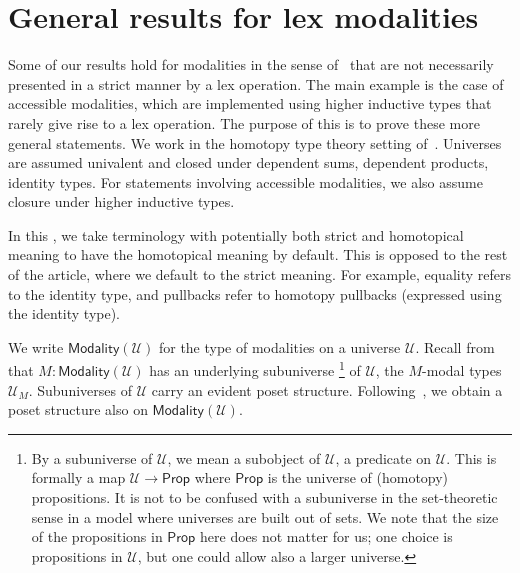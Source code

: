 \documentclass[10pt,a4paper,draft]{article}
\newcommand{\UU}{\mathcal{U}}%
\newcommand{\D}{D}              %
\renewcommand{\~}{\widetilde}
\newcommand{\Modality}{\mathsf{Modality}}
\newcommand{\aug}{\mathsf{aug}}
\newcommand{\M}{\mathcal{M}}
\newcommand{\join}{\mathop{\star}}
\newcommand{\Prop}{\mathsf{Prop}}
\newcounter{diagram}
\newtheorem{lemma}[theorem]{Lemma}
\theoremstyle{definition}
\theoremstyle{remark} %
\begin{document}

\section{General results for lex modalities}\label{sec:general-results}

Some of our results hold for modalities in the sense of~\cite{RijkeSS17} that are not necessarily presented in a strict manner by a lex operation.
The main example is the case of accessible modalities, which are implemented using higher inductive types that rarely give rise to a lex operation.
The purpose of this  is to prove these more general statements.
We work in the homotopy type theory setting of~\cite{RijkeSS17}.
Universes are assumed univalent and closed under dependent sums, dependent products, identity types.
For statements involving accessible modalities, we also assume closure under higher inductive types.

In this , we take terminology with potentially both strict and homotopical meaning to have the homotopical meaning by default.
This is opposed to the rest of the article, where we default to the strict meaning.
For example, equality refers to the identity type, and pullbacks refer to homotopy pullbacks (expressed using the identity type).

We write $\Modality(\UU)$ for the type of modalities on a universe $\UU$.
Recall from~\cite{RijkeSS17} that $M : \Modality(\UU)$ has an underlying subuniverse%
\footnote{%
By a subuniverse of $\UU$, we mean a subobject of $\UU$, \ie a predicate on $\UU$.
This is formally a map $\UU \to \Prop$ where $\Prop$ is the universe of (homotopy) propositions.
It is not to be confused with a subuniverse in the set\hyp{}theoretic sense in a model where universes are built out of sets.
We note that the size of the propositions in $\Prop$ here does not matter for us; one choice is propositions in $\UU$, but one could allow also a larger universe.
}
of $\UU$, the $M$\hyp{}modal types $\UU_M$.
Subuniverses of $\UU$ carry an evident poset structure.
Following~\cite[Subsection~3.2]{RijkeSS17}, we obtain a poset structure also on $\Modality(\UU)$.
\end{document}
